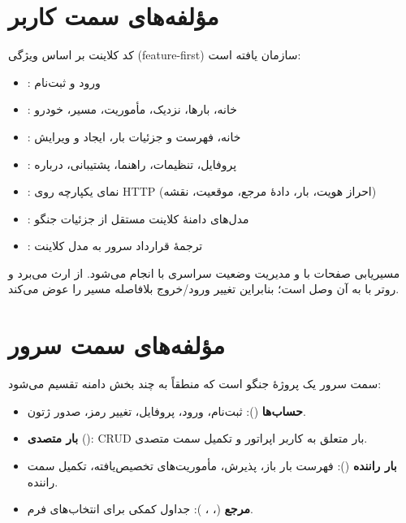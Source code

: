 \section{مؤلفه‌های سمت کاربر}

کد کلاینت بر اساس ویژگی (\textenglish{feature-first}) سازمان یافته است:

\begin{itemize}
  \item {}: ورود و ثبت‌نام
  \item {}: خانه، بارها، نزدیک، مأموریت، مسیر، خودرو
  \item {}: خانه، فهرست و جزئیات بار، ایجاد و ویرایش
  \item {}: پروفایل، تنظیمات، راهنما، پشتیبانی، درباره
  \item {}: نمای یکپارچه روی \textenglish{HTTP} (احراز هویت، بار، دادهٔ مرجع، موقعیت، نقشه)
  \item {}: مدل‌های دامنهٔ کلاینت مستقل از جزئیات جنگو
  \item {}: ترجمهٔ قرارداد سرور به مدل کلاینت
\end{itemize}

مسیریابی صفحات با  و مدیریت وضعیت سراسری با  انجام می‌شود.  از  ارث می‌برد و روتر با  به آن وصل است؛ بنابراین تغییر ورود/خروج بلافاصله مسیر را عوض می‌کند.

\section{مؤلفه‌های سمت سرور}

سمت سرور یک پروژهٔ جنگو است که منطقاً به چند بخش دامنه تقسیم می‌شود:

\begin{itemize}
  \item \textbf{حساب‌ها} (): ثبت‌نام، ورود، پروفایل، تغییر رمز، صدور ژتون.
  \item \textbf{بار متصدی} (): \textenglish{CRUD} بار متعلق به کاربر اپراتور و تکمیل سمت متصدی.
  \item \textbf{بار راننده} (): فهرست بار باز، پذیرش، مأموریت‌های تخصیص‌یافته، تکمیل سمت راننده.
  \item \textbf{مرجع} (، ، ): جداول کمکی برای انتخاب‌های فرم.
\end{itemize}

